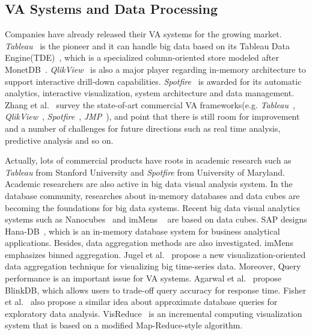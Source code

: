 \documentclass[journal]{vgtc}                %
\begin{document}
{\subsection{VA Systems and Data Processing }
Companies have already released their VA systems for the growing market. \textit{Tableau}~\cite{tab} is the pioneer and it can handle big data based on its Tableau Data Engine(TDE)~\cite{Wesley}, which is a specialized column-oriented store modeled after MonetDB~\cite{Boncz05monetdb}. \textit{QlikView}~\cite{qlikview} is also a major player regarding in-memory architecture to support interactive drill-down capabilities. \textit{Spotfire}~\cite{spotfire} is awarded for its automatic analytics, interactive visualization, system architecture and data management. Zhang et al.~\cite{Zhang2012} survey the state-of-art commercial VA frameworks(e.g. \textit{Tableau}~\cite{tab}, \textit{QlikView}~\cite{qlikview}, \textit{Spotfire}~\cite{spotfire}, \textit{JMP}~\cite{jmp}), and point that there is still room for improvement and a number of challenges for future directions such as real time analysis, predictive analysis and so on.

Actually, lots of commercial products have roots in academic research such as \textit{Tableau} \cite{tab} from Stanford University and \textit{Spotfire} \cite{spotfire} from University of Maryland. Academic researchers are also active in big data visual analysis system. In the database community, researches about in-memory databases and data cubes are becoming the foundations for big data systems. Recent big data visual analytics systems such as Nanocubes~\cite{Lins2013} and imMens ~\cite{2013-immens} are based on data cubes. SAP designs Hana-DB~\cite{farber2012sap}, which is an in-memory database system for business analytical applications. Besides, data aggregation methods are also investigated. imMens ~\cite{2013-immens} emphasizes  binned aggregation. Jugel et al.~\cite{jugel2014m4} propose a new visualization-oriented data aggregation technique for visualizing big time-series data. Moreover, Query performance is  an important issue for VA systems. Agarwal et al.~\cite{Agarwal} propose BlinkDB, which allows users to trade-off query accuracy for response time. Fisher et al.~\cite{Fisher2012} also propose a similar idea about approximate database queries for exploratory data analysis. %
VisReduce~\cite{im2013visreduce} is an incremental computing visualization system that is  based on a modified Map-Reduce-style algorithm. 


}
\end{document}
